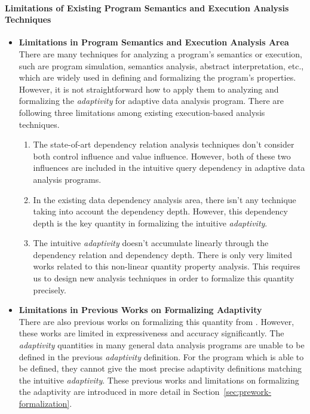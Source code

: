 \paragraph{Limitations of Existing Program Semantics and Execution Analysis Techniques}

\begin{itemize}
 \item \textbf{Limitations in Program Semantics and Execution Analysis Area}
 \\
There are many techniques for analyzing a program's semantics or execution, such are program simulation, 
semantics analysis, abstract interpretation, etc., which are widely used in defining
and formalizing the program's properties.
However, it is not straightforward how to apply them to analyzing and formalizing the \emph{adaptivity}
for adaptive data analysis program.
There are following three limitations among existing execution-based analysis techniques.
\begin{enumerate}
\item The state-of-art dependency relation analysis techniques don't
consider both control influence and value influence. However, both of these
two influences are included in the intuitive query dependency 
in adaptive data analysis programs.
\item In the existing data dependency analysis area, there isn't any technique taking into account
the dependency depth. However, this dependency depth is the key quantity in formalizing the intuitive \emph{adaptivity}.
\item The intuitive \emph{adaptivity} doesn't accumulate linearly through the dependency relation and 
dependency depth. There is only very limited works related to this non-linear quantity property analysis.
This requires us to design new analysis techniques in order to formalize this quantity precisely.
\end{enumerate}
\item \textbf{Limitations in Previous Works on Formalizing Adaptivity} 
\\
There are also previous works on formalizing this quantity from \cite{weihao22}. However, these works
are limited in expressiveness and accuracy significantly.
The \emph{adaptivity} quantities in many general data analysis programs are unable to be defined in the previous \emph{adaptivity} definition.
For the program which is able to be defined,
they cannot give the most precise adaptivity definitions matching the intuitive \emph{adaptivity}.
These previous works and limitations on formalizing the adaptivity are introduced in more detail in Section~\ref{sec:prework-formalization}.
\end{itemize}
%

